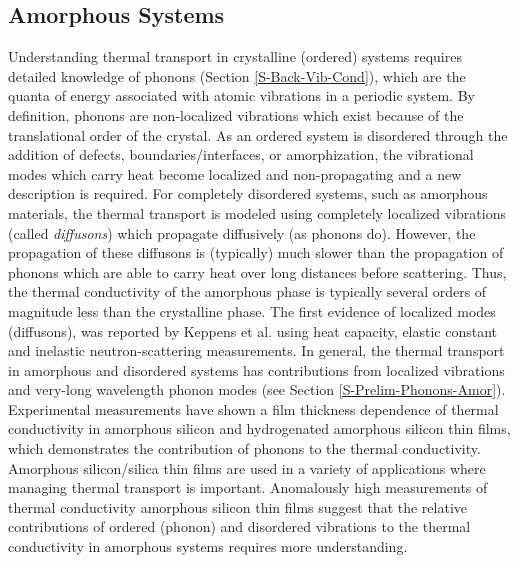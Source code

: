 \documentclass[letterpaper,12pt]{article}
\begin{document}
\subsection{\label{S-Motivation-Amorphous}Amorphous Systems}
Understanding thermal transport in crystalline (ordered) systems requires detailed knowledge of phonons (Section \ref{S-Back-Vib-Cond}), which are the quanta of energy associated with atomic vibrations in a periodic system.\cite{dove1993,ashcroft1976,srivastava1990,wallace1972} By definition, phonons are non-localized vibrations which exist because of the translational order of the crystal. As an ordered system is disordered through the addition of defects, boundaries/interfaces, or amorphization, the vibrational modes which carry heat become localized and non-propagating and a new description is required. For completely disordered systems, such as amorphous materials, the thermal transport is modeled using completely localized vibrations (called \emph{diffusons}) which propagate diffusively (as phonons do).\cite{allen1993} However, the propagation of these diffusons is (typically) much slower than the propagation of phonons which are able to carry heat over long distances before scattering. Thus, the thermal conductivity of the amorphous phase is typically several orders of magnitude less than the crystalline phase.\cite{freeman1986,cahill1992} The first evidence of localized modes (diffusons), was reported by Keppens et al. using heat
capacity, elastic constant and inelastic neutron-scattering
measurements.\cite{keppens1998} 
In general, the thermal transport in amorphous and disordered systems has contributions from localized vibrations and very-long wavelength phonon modes (see Section \ref{S-Prelim-Phonons-Amor}). Experimental measurements have shown a film thickness dependence of thermal conductivity in amorphous silicon \cite{Moon_2002} and hydrogenated amorphous silicon thin films\cite{PhysRevLett.102.035901}, which demonstrates the contribution of phonons to the thermal conductivity. Amorphous silicon/silica thin films are used in a variety of applications where managing thermal transport is important. Anomalously high measurements of thermal conductivity amorphous silicon thin films\cite{PhysRevB.81.104203} suggest that the relative contributions of ordered (phonon) and disordered vibrations to the thermal conductivity in amorphous systems requires more understanding.\cite{Zink_Pietri_Hellman_2006}
\end{document}
